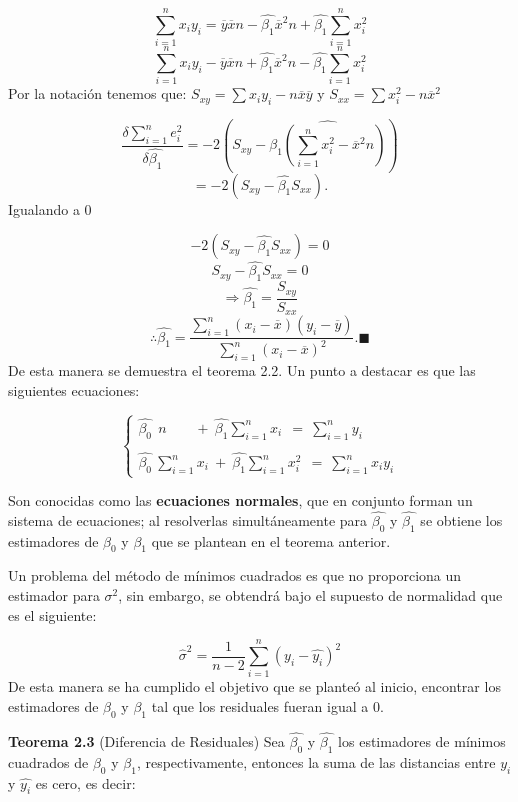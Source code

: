 \documentclass[a4paper,oneside,openany]{book}
\begin{document}
\[\sum_{i=1}^{n}x_{i}y_{i}=\overline{y}\overline{x}n-\hat{\beta_{1}}\overline{x}^2n+\hat{\beta_{1}}\sum_{i=1}^{n}x_{i}^2\]
\[\sum_{i=1}^{n}x_{i}y_{i}-\overline{y}\overline{x}n+\hat{\beta_{1}}\overline{x}^2n-\hat{\beta_{1}}\sum_{i=1}^{n}x_{i}^2\]
Por la notación tenemos que:
\(S_{xy}=\sum x_{i}y_{i} - n \overline{x}\overline{y}\) y
\(S_{xx}= \sum x_{i}^2 - n\overline{x}^2\)

\[\frac{\delta \sum_{i=1}^{n}e_{i}^2}{\delta\hat{\beta_{1}}}=-2\left(S_{xy}-\hat{\beta_{1}\left(\sum_{i=1}^{n}x_{i}^2-\overline{x}^2n\right)}\right)\]
\[=-2(S_{xy}-\hat{\beta_{1}}S_{xx}).\] Igualando a 0

\[-2(S_{xy}-\hat{\beta_{1}}S_{xx})=0\]
\[S_{xy}-\hat{\beta_{1}}S_{xx}=0\]
\[\Rightarrow \hat{\beta_{1}}=\frac{S_{xy}}{S_{xx}}\]
\[\therefore \hat{\beta_{1}}=\frac{\sum_{i=1}^{n}(x_{i}-\overline{x})(y_{i}-\overline{y})}{\sum_{i=1}^{n}(x_{i}-\overline{x})^2}.\blacksquare\]
De esta manera se demuestra el teorema 2.2. Un punto a destacar es que
las siguientes ecuaciones:

\[
\left\{
\begin{array}{ll} \hat{\beta_{0}} \ \ n  \ \ \  \ \ \ \ \ \ + \ \hat{\beta_{1}}\sum_{i=1}^{n}x_{i}\  \ = \ \sum_{i=1}^{n}y_{i} \\
\\
\hat{\beta_{0}} \ \sum_{i=1}^{n}x_{i} \ + \ \hat{\beta_{1}}\sum_{i=1}^{n}x_{i}^2 \ \ = \ \sum_{i=1}^{n}x_{i}y_{i}
\end{array}
\right. 
\]

Son conocidas como las \textbf{ecuaciones normales}, que en conjunto
forman un sistema de ecuaciones; al resolverlas simultáneamente para
\(\hat{\beta_{0}}\) y \(\hat{\beta_{1}}\) se obtiene los estimadores de
\(\beta_{0}\) y \(\beta_{1}\) que se plantean en el teorema anterior.

Un problema del método de mínimos cuadrados es que no proporciona un
estimador para \(\sigma^2\), sin embargo, se obtendrá bajo el supuesto
de normalidad que es el siguiente:

\[\hat{\sigma}^2=\frac{1}{n-2}\sum_{i=1}^{n}(y_{i}-\hat{y_{i}})^2\] De
esta manera se ha cumplido el objetivo que se planteó al inicio,
encontrar los estimadores de \(\beta_{0}\) y \(\beta_{1}\) tal que los
residuales fueran igual a 0.

\textbf{Teorema 2.3} (Diferencia de Residuales) Sea \(\hat{\beta_{0}}\)
y \(\hat{\beta_{1}}\) los estimadores de mínimos cuadrados de
\(\beta_{0}\) y \(\beta_{1}\), respectivamente, entonces la suma de las
distancias entre \(y_{i}\) y \(\hat{y_{i}}\) es cero, es decir:
\end{document}
